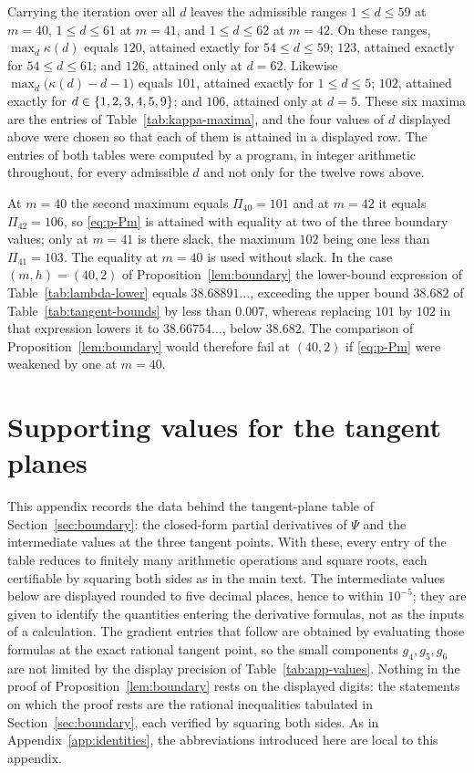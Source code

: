 \documentclass[11pt]{article}
\theoremstyle{definition}
\theoremstyle{remark}
\numberwithin{equation}{section}
\DeclarePairedDelimiter{\set}{\{}{\}}
\begin{document}
Carrying the iteration over all $d$ leaves the admissible ranges $1\le d\le59$
at $m=40$, $1\le d\le61$ at $m=41$, and $1\le d\le62$ at $m=42$. On these
ranges, $\max_d\kappa(d)$ equals $120$, attained exactly for $54\le d\le59$;
$123$, attained exactly for $54\le d\le61$; and $126$, attained only at $d=62$.
Likewise $\max_d\bigl(\kappa(d)-d-1\bigr)$ equals $101$, attained exactly for
$1\le d\le5$; $102$, attained exactly for $d\in\set{1,2,3,4,5,9}$; and $106$,
attained only at $d=5$. These six maxima are the entries of
Table~\ref{tab:kappa-maxima}, and the four values of $d$ displayed above were
chosen so that each of them is attained in a displayed row. The entries of both
tables were computed by a program, in integer arithmetic throughout, for every
admissible $d$ and not only for the twelve rows above.

At $m=40$ the second maximum equals $\Pi_{40}=101$ and at $m=42$ it equals
$\Pi_{42}=106$, so \eqref{eq:p-Pm} is attained with equality at two of the three
boundary values; only at $m=41$ is there slack, the maximum $102$ being one less
than $\Pi_{41}=103$. The equality at $m=40$ is used without slack. In the case
$(m,h)=(40,2)$ of Proposition~\ref{lem:boundary} the
lower-bound expression of Table~\ref{tab:lambda-lower} equals
$38.68891\ldots$, exceeding the upper bound $38.682$ of
Table~\ref{tab:tangent-bounds} by less than $0.007$, whereas replacing $101$ by
$102$ in that expression lowers it to $38.66754\ldots$, below $38.682$. The
comparison of Proposition~\ref{lem:boundary} would therefore fail at $(40,2)$ if
\eqref{eq:p-Pm} were weakened by one at $m=40$.

\section{Supporting values for the tangent planes}\label{app:tangent}

This appendix records the data behind the tangent-plane table of
Section~\ref{sec:boundary}: the closed-form partial derivatives of $\Psi$
and the intermediate values at the three tangent points. With these, every
entry of the table reduces to finitely many arithmetic operations and square
roots, each certifiable by squaring both sides as in the main text. The
intermediate values below are displayed rounded to five decimal places, hence
to within $10^{-5}$; they are given to identify the quantities entering the
derivative formulas, not as the inputs of a calculation. The gradient entries
that follow are obtained by evaluating those formulas at the exact rational
tangent point, so the small components $g_4,g_5,g_6$ are not limited by the
display precision of Table~\ref{tab:app-values}. Nothing in the proof of
Proposition~\ref{lem:boundary} rests on the displayed digits: the statements on which
the proof rests are the rational inequalities tabulated in
Section~\ref{sec:boundary}, each verified by squaring both sides. As in
Appendix~\ref{app:identities}, the abbreviations introduced here are local
to this appendix.
\end{document}
